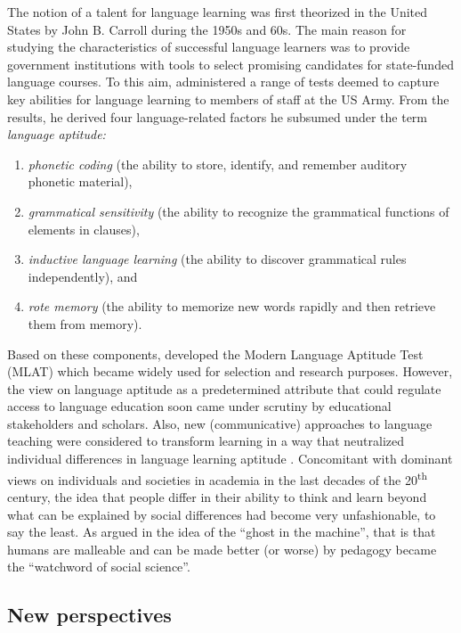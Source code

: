 \documentclass[output=paper]{langsci/langscibook}
\begin{document}
The notion of a talent for language learning was first theorized in the United States by John B. Carroll during the 1950s and 60s. The main reason for studying the characteristics of successful language learners was to provide government institutions with tools to select promising candidates for state-funded language courses. To this aim, \citet{Carroll1964} administered a range of tests deemed to capture key abilities for language learning to members of staff at the US Army. From the results, he derived four language-related factors he subsumed under the term \textit{language aptitude:} 

\begin{enumerate}
\item \textit{phonetic coding} (the ability to store, identify, and remember auditory phonetic material), 
\item \textit{grammatical sensitivity} (the ability to recognize the grammatical functions of elements in clauses), 
\item \textit{inductive language learning} (the ability to discover grammatical rules independently), and 
\item \textit{rote memory} (the ability to memorize new words rapidly and then retrieve them from memory). 
\end{enumerate}

Based on these components, \citet{CarrollSapon1959} developed the Modern Language Aptitude Test (MLAT) which became widely used for selection and research purposes. However, the view on language aptitude as a predetermined attribute that could regulate access to language education soon came under scrutiny by educational stakeholders and scholars. Also, new (communicative) approaches to language teaching were considered to transform learning in a way that neutralized individual differences in language learning aptitude \citep[72]{Skehan2002}. Concomitant with dominant views on individuals and societies in academia in the last decades of the 20\textsuperscript{th} century, the idea that people differ in their ability to think and learn beyond what can be explained by social differences had become very unfashionable, to say the least. As argued in \citet[28]{Pinker2003} the idea of the “ghost in the machine”, that is that humans are malleable and can be made better (or worse) by pedagogy became the “watchword of social science”.

\subsection{New perspectives} 
\end{document}

